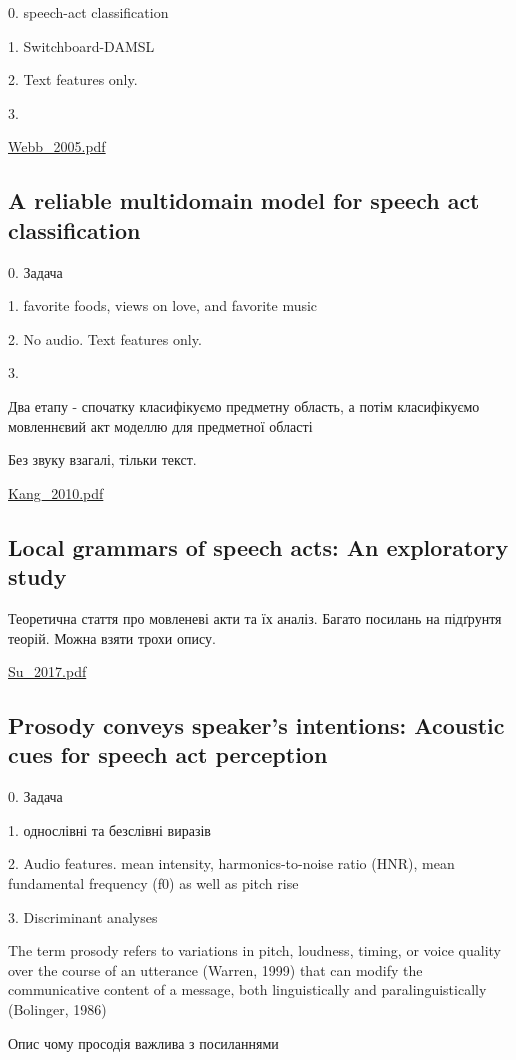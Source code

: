 0. speech-act classification

1. Switchboard-DAMSL

2. Text features only.

3. 

\url{Webb_2005.pdf}\cite{Webb_2005}

\subsection{A reliable multidomain model for speech act classification}

0. Задача

1. favorite foods, views on love, and favorite music

2. No audio. Text features only. 

3. 

Два етапу - спочатку класифікуємо предметну область, а потім класифікуємо мовленнєвий акт моделлю для предметної області

Без звуку взагалі, тільки текст.

\url{Kang_2010.pdf}\cite{Kang_2010}

\subsection{Local grammars of speech acts: An exploratory study}

Теоретична стаття про мовленеві акти та їх аналіз. Багато посилань на підґрунтя теорій. Можна взяти трохи опису.

\url{Su_2017.pdf}\cite{Su_2017}

\subsection{Prosody conveys speaker’s intentions: Acoustic cues for speech act perception}

0. Задача

1. однослівні та безслівні виразів

2. Audio features. mean intensity, harmonics-to-noise
ratio (HNR), mean fundamental frequency (f0) as well as
pitch rise

3. Discriminant analyses

The term prosody refers to variations in pitch, loudness, timing, or voice quality over the course of an utterance (Warren, 1999) that can modify the communicative content of a message, both linguistically and paralinguistically (Bolinger, 1986)

Опис чому просодія важлива з посиланнями

